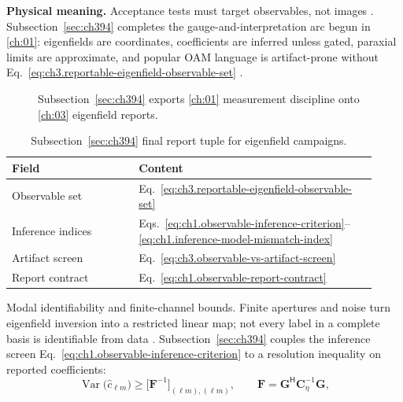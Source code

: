 \textbf{Physical meaning.} Acceptance tests must target observables, not images \cite{stratton1941}.
Subsection~\ref{sec:ch394} completes the gauge-and-interpretation arc begun in \ref{ch:01}: eigenfields are coordinates,
coefficients are inferred unless gated, paraxial limits are approximate, and popular OAM language is artifact-prone without
Eq.~\eqref{eq:ch3.reportable-eigenfield-observable-set} \cite{belinfante1940}.
\begin{figure}[t]
\centering
{}
\caption{Subsection~\ref{sec:ch394} exports \ref{ch:01} measurement discipline onto \ref{ch:03} eigenfield reports.}
\label{fig:ch3.394-chapter-closure}
\end{figure}
\begin{table}[t]
\centering
\caption{Subsection~\ref{sec:ch394} final report tuple for eigenfield campaigns.}
\label{tab:ch3.394-final-tuple}
\small
\begin{tabular}{@{}p{0.32\linewidth}p{0.60\linewidth}@{}}
\toprule
Field & Content \\
\midrule
Observable set & Eq.~\eqref{eq:ch3.reportable-eigenfield-observable-set} \\
Inference indices & Eqs.~\eqref{eq:ch1.observable-inference-criterion}--\eqref{eq:ch1.inference-model-mismatch-index} \\
Artifact screen & Eq.~\eqref{eq:ch3.observable-vs-artifact-screen} \\
Report contract & Eq.~\eqref{eq:ch1.observable-report-contract} \\
\bottomrule
\end{tabular}
\end{table}
Modal identifiability and finite-channel bounds. Finite apertures and noise turn eigenfield inversion into a restricted linear map; not every label in a complete basis is identifiable from data
\cite{harrington2001}. Subsection~\ref{sec:ch394} couples the inference screen
Eq.~\eqref{eq:ch1.observable-inference-criterion} to a resolution inequality on reported coefficients:
\begin{equation}
\label{eq:ch3.modal-identifiability-bound}
\operatorname{Var}\!\bigl(\widehat{c}_{\ell m}\bigr)
\ge
\bigl[\mathbf{F}^{-1}\bigr]_{(\ell m),(\ell m)},
\qquad
\mathbf{F}=\mathbf{G}^{\mathsf{H}}\mathbf{C}_{\eta}^{-1}\mathbf{G},
\end{equation}
